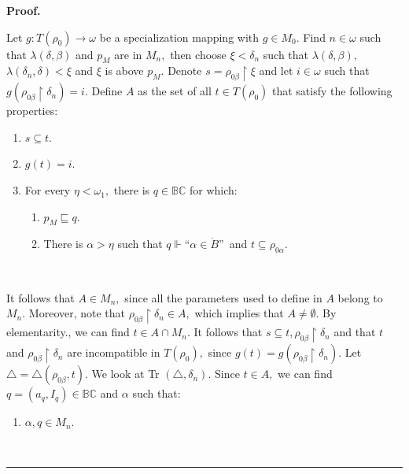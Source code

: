 \documentclass{article}
\newenvironment{proof}[1][Proof]{\noindent\textbf{#1.} }{\ \rule{0.5em}{0.5em}}
\begin{document}
\begin{proof}
\qquad\ \ \ \qquad\ \ 

Let $g:T\left(  \rho_{0}\right)  \longrightarrow\omega$ be a specialization
mapping with $g\in M_{0}.$ Find $n\in\omega$ such that $\lambda\left(
\delta,\beta\right)  $ and $p_{M}$ are in $M_{n},$ then choose $\xi<\delta
_{n}$ such that $\lambda\left(  \delta,\beta\right)  ,$ $\lambda\left(
\delta_{n},\delta\right)  <\xi$ and $\xi$ is above $p_{M}.$ Denote
$s=\rho_{0\beta}\upharpoonright\xi$ and let $i\in\omega$ such that $g\left(
\rho_{0\beta}\upharpoonright\delta_{n}\right)  =i.$ Define $A$ as the set of
all $t\in T\left(  \rho_{0}\right)  $ that satisfy the following properties:

\begin{enumerate}
\item $s\subseteq t.$

\item $g\left(  t\right)  =i.$

\item For every $\eta<\omega_{1},$ there is $q\in\mathbb{BC}$ for which:

\begin{enumerate}
\item $p_{M}\sqsubseteq q.$

\item There is $\alpha>\eta$ such that $q\Vdash$\textquotedblleft$\alpha
\in\dot{B}$\textquotedblright\ and $t\subseteq\rho_{0\alpha}.$
\end{enumerate}
\end{enumerate}

\qquad\ \ 

It follows that $A\in M_{n},$ since all the parameters used to define in $A$
belong to $M_{n}.$ Moreover, note that $\rho_{0\beta}\upharpoonright\delta
_{n}\in A,$ which implies that $A\neq\emptyset.$ By elementarity., we can find
$t\in A\cap M_{n}.$ It follows that $s\subseteq t,\rho_{0\beta}\upharpoonright
\delta_{n}$ and that $t$ and $\rho_{0\beta}\upharpoonright\delta_{n}$ are
incompatible in $T\left(  \rho_{0}\right)  ,$ since $g\left(  t\right)
=g\left(  \rho_{0\beta}\upharpoonright\delta_{n}\right)  .$ Let $\triangle
=\triangle\left(  \rho_{0\beta},t\right)  .$ We look at \textsf{Tr}%
$(\triangle,\delta_{n}).$ Since $t\in A,$ we can find $q=\left(  a_{q}%
,I_{q}\right)  \in\mathbb{BC}$ and $\alpha$ such that:

\begin{enumerate}
\item $\alpha,q\in M_{n}.$


\end{enumerate}
\end{proof}
\end{document}
